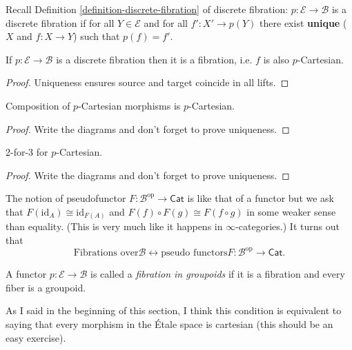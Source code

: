 \noindent
Recall Definition
\ref{definition-discrete-fibration} of
discrete fibration:
$p:\mathcal{E} \to \mathcal{B}$ is a discrete
fibration if for all
$Y \in \mathcal{E}$
and for all $f':X' \to p(Y)$ there exist
{\bf unique} ($X$ and  $f:X \to Y$) such that
$p(f)=f'$.

\begin{lemma}
\label{lemma-discrete-fibration-is-fibration}
If $p:\mathcal{E} \to \mathcal{B}$
is a discrete fibration then it is a
fibration,
i.e.  $f$ is also $p$-Cartesian.
\end{lemma}

\begin{proof}
Uniqueness ensures source and target coincide
in all lifts.
\end{proof}

\begin{lemma}
\label{lemma-composition-p-cartesian}
Composition of $p$-Cartesian morphisms is
$p$-Cartesian.
\end{lemma}

\begin{proof}
Write the diagrams and don't forget to prove
uniqueness.
\end{proof}

\begin{lemma}
\label{lemma-2-for-3-p-cartesian}
2-for-3 for $p$-Cartesian.
\end{lemma}

\begin{proof}
Write the diagrams and don't forget to prove
uniqueness.
\end{proof}

\medskip\noindent
The notion of pseudofunctor
$F:\mathcal{B}^{\text{op}} \to \mathsf{Cat}$
is like that of a functor but we ask that
$F(\text{id}_A) \cong \text{id}_{F(A)}$
and $F(f) \circ F(g) \cong F(f \circ g)$
in some weaker sense than equality.
(This is very much like it happens in
$\infty$-categories.)
It turns out that
$$
\text{Fibrations over
$\mathcal{B}$}\leftrightarrow
\text{pseudo functors
}F:\mathcal{B}^{\text{op}}\to \mathsf{Cat}.
$$

\begin{definition}
\label{definition-fibred-in-groupoids}
A functor $p:\mathcal{E} \to \mathcal{B}$ is
called a
{\it fibration in groupoids}
if it is a fibration and every fiber is a
groupoid.
\end{definition}

\noindent
As I said in the beginning of this section,
I think this condition is equivalent to
saying that
every morphism in the Étale space is
cartesian
(this should be an easy exercise).

